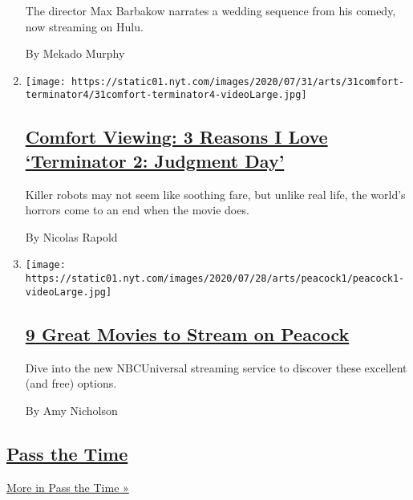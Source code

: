 \begin{enumerate}
  The director Max Barbakow narrates a wedding sequence from his comedy,
  now streaming on Hulu.

  By Mekado Murphy
\item
  \texttt{[image: https://static01.nyt.com/images/2020/07/31/arts/31comfort-terminator4/31comfort-terminator4-videoLarge.jpg]}

  \hypertarget{comfort-viewing-3-reasons-i-love-terminator-2-judgment-day}{%
  \subsection{\texorpdfstring{\href{/2020/07/31/movies/comfort-viewing-terminator-2.html}{Comfort
  Viewing: 3 Reasons I Love `Terminator 2: Judgment
  Day'}}{Comfort Viewing: 3 Reasons I Love `Terminator 2: Judgment Day'}}\label{comfort-viewing-3-reasons-i-love-terminator-2-judgment-day}}

  Killer robots may not seem like soothing fare, but unlike real life,
  the world's horrors come to an end when the movie does.

  By Nicolas Rapold
\item
  \texttt{[image: https://static01.nyt.com/images/2020/07/28/arts/peacock1/peacock1-videoLarge.jpg]}

  \hypertarget{9-great-movies-to-stream-on-peacock}{%
  \subsection{\texorpdfstring{\href{/2020/07/29/movies/what-to-stream-on-peacock.html}{9
  Great Movies to Stream on
  Peacock}}{9 Great Movies to Stream on Peacock}}\label{9-great-movies-to-stream-on-peacock}}

  Dive into the new NBCUniversal streaming service to discover these
  excellent (and free) options.

  By Amy Nicholson
\end{enumerate}

\hypertarget{pass-the-time}{%
\subsection{\texorpdfstring{\href{/spotlight/pass-the-time}{Pass the
Time}}{Pass the Time}}\label{pass-the-time}}

\href{/spotlight/pass-the-time}{More in Pass the Time »}

